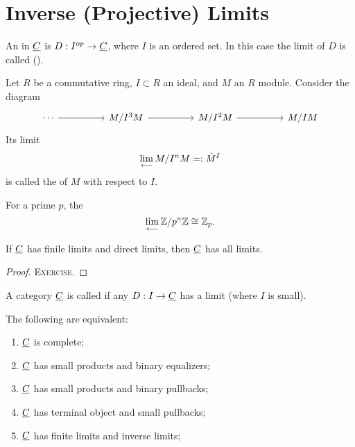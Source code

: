 \section{Inverse (Projective) Limits}

\begin{definition*}
	An  in \( \underline{C} \) is \( D: I^{op} \to \underline{C} \), where \( I \) is an ordered set. In this case the limit of \( D \) is called  ().
\end{definition*}

\begin{examples*}
	\item Let \( R \) be a commutative ring, \( I \subset R \) an ideal, and \( M \) an \( R \) module. Consider the diagram
		\[
			\begin{tikzcd}
				\dotsb && {M/I^3M} && {M/I^2M} && {M/IM}
				\arrow[from=1-1, to=1-3]
				\arrow[from=1-3, to=1-5]
				\arrow[from=1-5, to=1-7]
			\end{tikzcd}
		\]
		Its limit
		\[
			\lim_{\longleftarrow} M/I^nM =: \hat{M}^I
		\]
		is called the  of \( M \) with respect to \( I \).
	\item For a prime \( p \), the 
		\[
			\lim_{\longleftarrow} \mathbb{Z}/p^n\mathbb{Z} \cong \mathbb{Z}_p.
		\]
\end{examples*}

\begin{proposition*}
	If \( \underline{C} \) has finile limits and direct limits, then \( \underline{C} \) has all limits.
\end{proposition*}
\begin{proof}
	\textsc{Exercise}.
\end{proof}

\begin{definition*}
	A category \( \underline{C} \) is called  if any \( D: I \to \underline{C} \) has a limit (where \( I \) is small).
\end{definition*}

\begin{theorem*}
	The following are equivalent:
	\begin{enumerate}
		\item \( \underline{C} \) is complete;
		\item \( \underline{C} \) has small products and binary equalizers;
		\item \( \underline{C} \) has small products and binary pullbacks;
		\item \( \underline{C} \) has terminal object and small pullbacks;
		\item \( \underline{C} \) has finite limits and inverse limits;
	\end{enumerate}
\end{theorem*}

